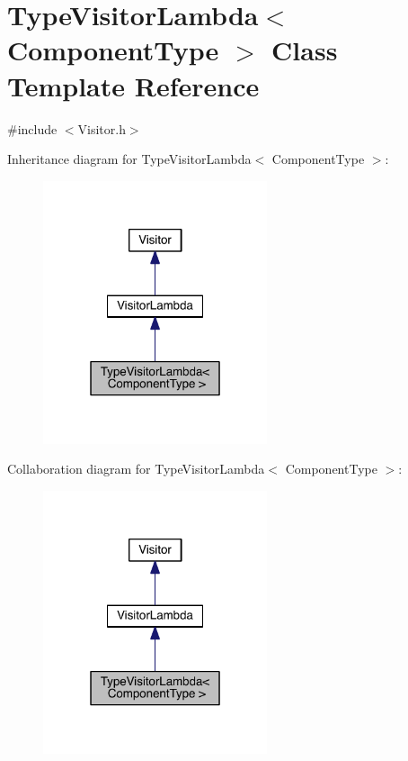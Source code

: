 \hypertarget{classTypeVisitorLambda}{\section{Type\+Visitor\+Lambda$<$ Component\+Type $>$ Class Template Reference}
\label{classTypeVisitorLambda}
}


{\ttfamily \#include $<$Visitor.\+h$>$}



Inheritance diagram for Type\+Visitor\+Lambda$<$ Component\+Type $>$\+:\nopagebreak
\begin{figure}[H]
\begin{center}
\leavevmode
\includegraphics[width=187pt]{classTypeVisitorLambda__inherit__graph}
\end{center}
\end{figure}


Collaboration diagram for Type\+Visitor\+Lambda$<$ Component\+Type $>$\+:\nopagebreak
\begin{figure}[H]
\begin{center}
\leavevmode
\includegraphics[width=187pt]{classTypeVisitorLambda__coll__graph}
\end{center}
\end{figure}
